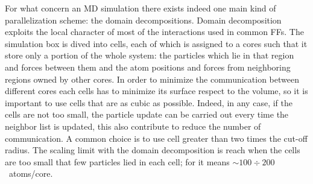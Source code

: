 For what concern an \ac{MD} simulation there exists indeed one main kind of parallelization scheme: the domain decompositions. Domain decomposition exploits the local character of most of the interactions used in common \acp{FF}. The simulation box is dived into cells, each of which is assigned to a cores such that it store only a portion of the whole system: the particles which lie in that region and forces between them and the atom positions and forces from neighboring regions owned by other cores. In order to minimize the communication between different cores each cells has to minimize its surface respect to the volume, so it is important to use cells that are as cubic as possible. Indeed, in any case, if the cells are not too small, the particle update can be carried out every time the neighbor list is updated, this also contribute to reduce the number of communication. A common choice is to use cell greater than two times the cut-off radius. The scaling limit with the domain decomposition is reach when the cells are too small that few particles lied in each cell; for \gromacs it means $\sim 100 \div 200$~atoms/core.


